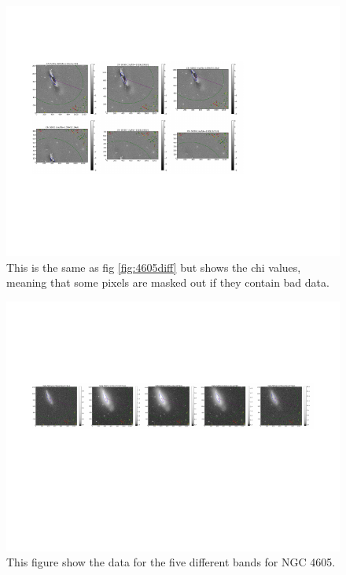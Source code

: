 \documentclass[12pt,preprint,pdftex]{aastex}
\begin{document}
\begin{figure}
\centering
\includegraphics[trim = 1cm 3.2cm 3.8cm 2.15cm,clip=true,width=\textwidth] {chi.pdf}
\caption{This is the same as fig \ref{fig:4605diff} but shows the chi values, meaning that some pixels are masked out if they contain bad data.}
\label{fig:4605chi}
\end{figure}

\begin{figure}
\centering
\includegraphics[trim = .9cm 4.5cm 0cm 2.9cm,clip=true,width=\textwidth] {goodsingle-colors-data.pdf}
\caption{This figure show the data for the five different bands for NGC 4605.}
\label{fig:colorsdata}
\end{figure}
\end{document}
